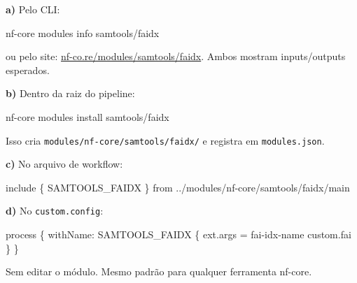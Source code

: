 \documentclass[
  brazilian,
  letterpaper,
  DIV=11,
  numbers=noendperiod]{scrreprt}
\newenvironment{Shaded}{\begin{snugshade}}{\end{snugshade}}
\newcommand{\ExtensionTok}[1]{\textcolor[rgb]{0.00,0.23,0.31}{#1}}
\newcommand{\NormalTok}[1]{\textcolor[rgb]{0.00,0.23,0.31}{#1}}
\newcommand{\OperatorTok}[1]{\textcolor[rgb]{0.37,0.37,0.37}{#1}}
\newcommand{\StringTok}[1]{\textcolor[rgb]{0.13,0.47,0.30}{#1}}
\begin{document}
\begin{tcolorbox}[enhanced jigsaw, arc=.35mm, bottomrule=.15mm, bottomtitle=1mm, breakable, colback=white, colbacktitle=quarto-callout-tip-color!10!white, colframe=quarto-callout-tip-color-frame, coltitle=black, left=2mm, leftrule=.75mm, opacityback=0, opacitybacktitle=0.6, rightrule=.15mm, title=\textcolor{quarto-callout-tip-color}{\faLightbulb}\hspace{0.5em}{Resposta}, titlerule=0mm, toprule=.15mm, toptitle=1mm]

\textbf{a)} Pelo CLI:

\begin{Shaded}
\begin{Highlighting}[]
\ExtensionTok{nf{-}core}\NormalTok{ modules info samtools/faidx}
\end{Highlighting}
\end{Shaded}

ou pelo site:
\href{https://nf-co.re/modules/samtools/faidx}{nf-co.re/modules/samtools/faidx}.
Ambos mostram inputs/outputs esperados.

\textbf{b)} Dentro da raiz do pipeline:

\begin{Shaded}
\begin{Highlighting}[]
\ExtensionTok{nf{-}core}\NormalTok{ modules install samtools/faidx}
\end{Highlighting}
\end{Shaded}

Isso cria \texttt{modules/nf-core/samtools/faidx/} e registra em
\texttt{modules.json}.

\textbf{c)} No arquivo de workflow:

\begin{Shaded}
\begin{Highlighting}[]
\NormalTok{include }\OperatorTok{\{}\NormalTok{ SAMTOOLS\_FAIDX }\OperatorTok{\}}\NormalTok{ from }\StringTok{\textquotesingle{}../modules/nf{-}core/samtools/faidx/main\textquotesingle{}}
\end{Highlighting}
\end{Shaded}

\textbf{d)} No \texttt{custom.config}:

\begin{Shaded}
\begin{Highlighting}[]
\NormalTok{process }\OperatorTok{\{}
\NormalTok{    withName}\OperatorTok{:} \StringTok{\textquotesingle{}SAMTOOLS\_FAIDX\textquotesingle{}} \OperatorTok{\{}
\NormalTok{        ext}\OperatorTok{.}\NormalTok{args }\OperatorTok{=} \StringTok{\textquotesingle{}{-}{-}fai{-}idx{-}name custom.fai\textquotesingle{}}
    \OperatorTok{\}}
\OperatorTok{\}}
\end{Highlighting}
\end{Shaded}

Sem editar o módulo. Mesmo padrão para qualquer ferramenta nf-core.

\end{tcolorbox}
\end{document}

